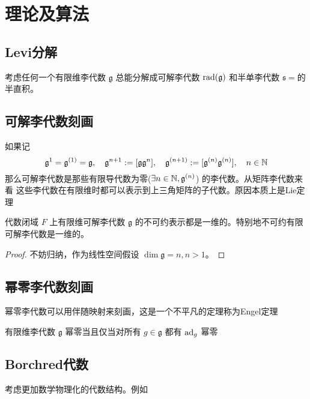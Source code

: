 \section{理论及算法}

\subsection{Levi分解}

考虑任何一个有限维李代数 $\mathfrak{g}$ 总能分解成可解李代数 $\mathrm{rad}(\mathfrak{g})$ 和半单李代数 $\mathfrak{s}=$的半直积。


\subsection{可解李代数刻画}

如果记 
\begin{equation*}
    \mathfrak{g}^1 = \mathfrak{g}^{(1)} = \mathfrak{g}, \quad
    \mathfrak{g}^{n+1} := [\mathfrak{g}\mathfrak{g}^{n}],\quad
    \mathfrak{g}^{(n+1)} := [\mathfrak{g}^{(n)}\mathfrak{g}^{(n)}],\quad n \in \mathbb{N}
\end{equation*}
那么可解李代数是那些有限导代数为零($\exists n \in \mathbb{N}, \mathfrak{g}^{(n)}$) 的李代数。从矩阵李代数来看
这些李代数在有限维时都可以表示到上三角矩阵的子代数。原因本质上是Lie定理

\begin{theorem}[Lie定理]
    代数闭域 $F$ 上有限维可解李代数 $\mathfrak{g}$ 的不可约表示都是一维的。特别地不可约有限可解李代数是一维的。
\end{theorem}

\begin{proof}
    不妨归纳，作为线性空间假设 $\dim \mathfrak{g} = n,n> 1$。
\end{proof}

\subsection{幂零李代数刻画}

幂零李代数可以用伴随映射来刻画，这是一个不平凡的定理称为Engel定理

\begin{theorem}[Engel定理]
    有限维李代数 $\mathfrak{g}$ 幂零当且仅当对所有 $g \in \mathfrak{g}$ 都有 $\mathrm{ad}_{g}$ 幂零
\end{theorem}


\subsection{Borchred代数}

考虑更加数学物理化的代数结构。例如

